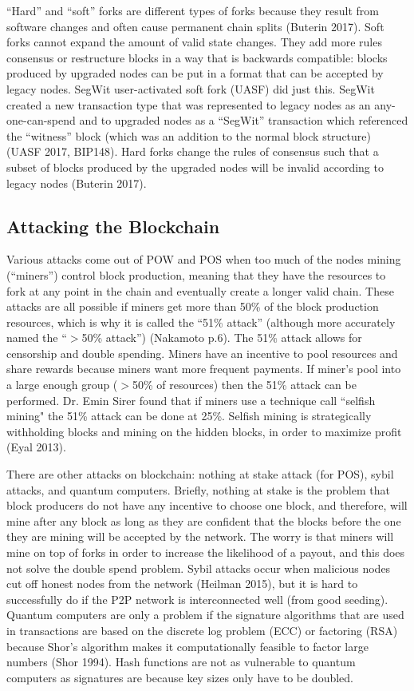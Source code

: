 \documentclass[letterpaper, 10 pt, conference]{ieeeconf}  %
\begin{document}
“Hard” and “soft” forks are different types of forks because they result from software changes and often cause permanent chain splits (Buterin 2017). Soft forks cannot expand the amount of valid state changes. They add more rules consensus or restructure blocks in a way that is backwards compatible: blocks produced by upgraded nodes can be put in a format that can be accepted by legacy nodes. SegWit user-activated soft fork (UASF) did just this. SegWit created a new transaction type that was represented to legacy nodes as an any-one-can-spend and to upgraded nodes as a “SegWit” transaction which referenced the “witness” block (which was an addition to the normal block structure) (UASF 2017, BIP148). Hard forks change the rules of consensus such that a subset of blocks produced by the upgraded nodes will be invalid according to legacy nodes (Buterin 2017). 

\subsection{Attacking the Blockchain}
Various attacks come out of POW and POS when too much of the nodes mining (“miners”) control block production, meaning that they have the resources to fork at any point in the chain and eventually create a longer valid chain. These attacks are all possible if miners get more than 50\% of the block production resources, which is why it is called the “51\% attack” (although more accurately named the “$>$50\% attack”) (Nakamoto p.6). The 51\% attack allows for censorship and double spending. Miners have an incentive to pool resources and share rewards because miners want more frequent payments. If miner’s pool into a large enough group ($>$50\% of resources) then the 51\% attack can be performed. Dr. Emin Sirer found that if miners use a technique call ``selfish mining" the 51\% attack can be done at 25\%. Selfish mining is strategically withholding blocks and mining on the hidden blocks, in order to maximize profit (Eyal 2013).

There are other attacks on blockchain: nothing at stake attack (for POS), sybil attacks, and quantum computers. Briefly, nothing at stake is the problem that block producers do not have any incentive to choose one block, and therefore, will mine after any block as long as they are confident that the blocks before the one they are mining will be accepted by the network. The worry is that miners will mine on top of forks in order to increase the likelihood of a payout, and this does not solve the double spend problem. Sybil attacks occur when malicious nodes cut off honest nodes from the network (Heilman 2015), but it is hard to successfully do if the P2P network is interconnected well (from good seeding). Quantum computers are only a problem if the signature algorithms that are used in transactions are based on the discrete log problem (ECC) or factoring (RSA) because Shor’s algorithm makes it computationally feasible to factor large numbers (Shor 1994). Hash functions are not as vulnerable to quantum computers as signatures are because key sizes only have to be doubled. 
\end{document}

